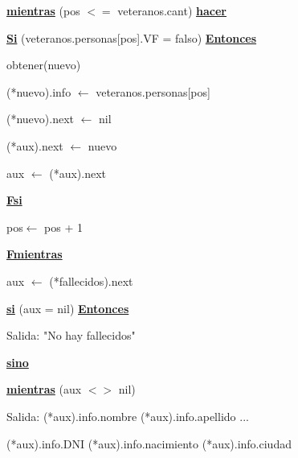 \documentclass{article}
\begin{document}
            \hspace{12mm}\underline{\textbf{mientras}} (pos $<=$ veteranos.cant) \underline{\textbf{hacer}}

                \hspace{16mm}\underline{\textbf{Si}} (veteranos.personas[pos].VF = falso) \underline{\textbf{Entonces}}

                    \hspace{20mm}obtener(nuevo)

                    \hspace{20mm}(*nuevo).info $\leftarrow$ veteranos.personas[pos]

                    \hspace{20mm}(*nuevo).next $\leftarrow$ nil

                    \hspace{20mm}(*aux).next $\leftarrow$ nuevo

                    \hspace{20mm}aux $\leftarrow$ (*aux).next

                \hspace{16mm}\underline{\textbf{Fsi}}

                \hspace{16mm}pos$\leftarrow$ pos + 1

            \hspace{12mm}\underline{\textbf{Fmientras}}

            \hspace{12mm}aux $\leftarrow$ (*fallecidos).next

            \hspace{12mm}\underline{\textbf{si}} (aux = nil) \underline{\textbf{Entonces}}

                \hspace{16mm}Salida: "No hay fallecidos"

            \hspace{12mm}\underline{\textbf{sino}}
                
                \hspace{16mm}\underline{\textbf{mientras}} (aux $<>$ nil)

                    \hspace{20mm}Salida: (*aux).info.nombre (*aux).info.apellido ...

                        \hspace{28mm}(*aux).info.DNI (*aux).info.nacimiento (*aux).info.ciudad
\end{document}
